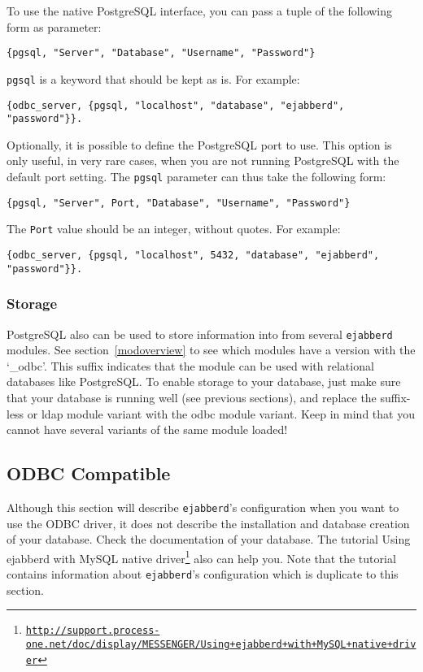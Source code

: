 \documentclass[a4paper,10pt]{book}
\newcommand{\ind}[1]{\begin{latexonly}\index{#1}\end{latexonly}}
\newcommand{\term}[1]{\texttt{#1}}
\newcommand{\ejabberd}{\texttt{ejabberd}}
\gdef\footahref#1#2{#2\footnote{\href{#1}{\texttt{#1}}}}
\begin{document}
To use the native PostgreSQL interface, you can pass a tuple of the following
form as parameter:
\begin{verbatim}
{pgsql, "Server", "Database", "Username", "Password"}
\end{verbatim}

\term{pgsql} is a keyword that should be kept as is. For example:
\begin{verbatim}
{odbc_server, {pgsql, "localhost", "database", "ejabberd", "password"}}.
\end{verbatim}

Optionally, it is possible to define the PostgreSQL port to use. This
option is only useful, in very rare cases, when you are not running
PostgreSQL with the default port setting. The \term{pgsql} parameter
can thus take the following form:
\begin{verbatim}
{pgsql, "Server", Port, "Database", "Username", "Password"}
\end{verbatim}

The \term{Port} value should be an integer, without quotes. For example:
\begin{verbatim}
{odbc_server, {pgsql, "localhost", 5432, "database", "ejabberd", "password"}}.
\end{verbatim}

\subsubsection{Storage}
\label{pgsqlstorage}
\ind{PostgreSQL!storage}

PostgreSQL also can be used to store information into from several \ejabberd{}
modules. See section~\ref{modoverview} to see which modules have a version
with the `\_odbc'. This suffix indicates that the module can be used with
relational databases like PostgreSQL. To enable storage to your database, just
make sure that your database is running well (see previous sections), and
replace the suffix-less or ldap module variant with the odbc module variant.
Keep in mind that you cannot have several variants of the same module loaded!

\subsection{ODBC Compatible}
\label{odbc}
\ind{databases!ODBC}

Although this section will describe \ejabberd{}'s configuration when you want to
use the ODBC driver, it does not describe the installation and database creation
of your database. Check the documentation of your database. The tutorial \footahref{http://support.process-one.net/doc/display/MESSENGER/Using+ejabberd+with+MySQL+native+driver}{Using ejabberd with MySQL native driver} also can help you. Note that the tutorial
contains information about \ejabberd{}'s configuration which is duplicate to
this section.
\end{document}
